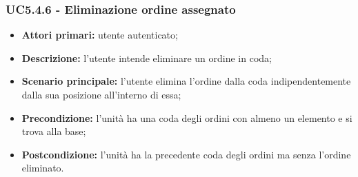         \subsubsection{UC5.4.6 - Eliminazione ordine assegnato}
        \begin{itemize}
            \item \textbf{Attori primari:} utente autenticato;
            \item \textbf{Descrizione:} l'utente intende eliminare un ordine in coda;
            \item \textbf{Scenario principale:} l'utente elimina l'ordine dalla coda indipendentemente dalla sua posizione all'interno di essa;
            \item \textbf{Precondizione:} l'unità ha una coda degli ordini con almeno un elemento e si trova alla base;
            \item \textbf{Postcondizione:} l'unità ha la precedente coda degli ordini ma senza l'ordine eliminato.
        \end{itemize}
